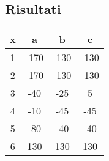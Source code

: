 \documentclass[11pt]{article}
\begin{document}
\subsection{Risultati}
\begin{table}[H]
    \begin{tabular}{|c|c|c|c|}
    \hline
    x & a & b & c \\ \hline \hline
    1 & -170 & -130 & -130 \\ \hline
    2 & -170 & -130 & -130 \\ \hline
    3 & -40 & -25 & 5 \\ \hline
    4 & -10 & -45 & -45 \\ \hline
    5 & -80 & -40 & -40 \\ \hline
    6 & 130 & 130 & 130 \\ \hline
    \end{tabular}
\end{table}
\end{document}
